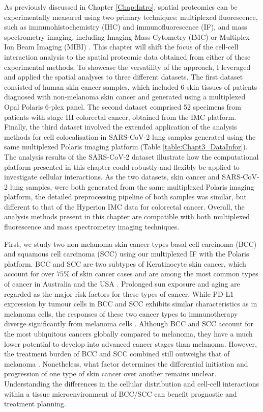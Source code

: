 As previously discussed in Chapter \ref{Chap:Intro}, spatial proteomics can be experimentally measured using two primary techniques: multiplexed fluorescence, such as immunohistochemistry (IHC) and immunofluorescence (IF), and mass spectrometry imaging, including Imaging Mass Cytometry (IMC) or Multiplex Ion Beam Imaging (MIBI) \cite{hoyt2021multiplex, baharlou2019mass}.  This chapter will shift the focus of the cell-cell interaction analysis to the spatial proteomic data obtained from either of these experimental methods. To showcase the versatility of the approach, I leveraged and applied the spatial analyses to three different datasets. The first dataset consisted of human skin cancer samples, which included 6 skin tissues of patients diagnosed with non-melanoma skin cancer and generated using a multiplexed Opal Polaris 6-plex panel. The second dataset comprised 52 specimens from patients with stage III  colorectal cancer, obtained from the IMC platform. Finally, the third dataset involved the extended  application of the analysis methods for cell colocalisation in SARS-CoV-2 lung samples generated using the same multiplexed Polaris imaging platform (Table \ref{table:Chapt3_DataInfor}). The analysis results of the SARS-CoV-2 dataset illustrate how the computational platform presented in this chapter could robustly and flexibly be applied to investigate cellular interactions. As the two datasets, skin cancer and SARS-CoV-2 lung samples, were both generated from the same multiplexed Polaris imaging platform, the detailed preprocessing pipeline of both samples was similar, but different to that of the Hyperion IMC data for colorectal cancer. Overall, the analysis methods present in this chapter are compatible with both multiplexed fluorescence and mass spectrometry imaging techniques. 

First, we study two non-melanoma skin cancer types basal cell carcinoma (BCC) and squamous cell carcinoma (SCC) using our multiplexed IF with the Polaris platform. BCC and SCC are two subtypes of Keratinocyte skin cancer, which account for over $75\%$ of skin cancer cases and are among the most common types of cancer in Australia and the USA \cite{rogers2015incidence, thomas2021interpretable}. Prolonged sun exposure and aging are regarded as the major risk factors for these types of cancer. While PD-L1 expression by tumour cells in BCC and SCC exhibits similar characteristics as in melanoma cells, the responses of these two cancer types to immunotherapy diverge significantly from melanoma cells \cite{stonesifer2021immune}. Although BCC and SCC account for the most ubiquitous cancers globally compared to melanoma, they have a much lower potential to develop into advanced cancer stages than melanoma. However, the treatment burden of BCC and SCC combined still outweighs that of melanoma \cite{stonesifer2021immune, leiter2020epidemiology}. Nonetheless, what factor determines the differential initiation and progression of one type of skin cancer over another remains unclear. Understanding the differences in the cellular distribution and cell-cell interactions within a tissue microenvironment of BCC/SCC can benefit prognostic and treatment planning. 

